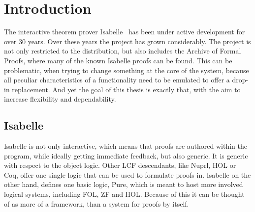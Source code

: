 
\chapter{Introduction}\label{chapter:introduction}

The interactive theorem prover Isabelle~\parencite{Paulson1986} has been under active development for over 30 years. Over these years the project has grown considerably. The project is not only restricted to the distribution, but also includes the Archive of Formal Proofs, where many of the known Isabelle proofs can be found. This can be problematic, when trying to change something at the core of the system, because all peculiar characteristics of a functionality need to be emulated to offer a drop-in replacement. And yet the goal of this thesis is exactly that, with the aim to increase flexibility and dependability.

\section{Isabelle}
Isabelle is not only interactive, which means that proofs are authored within the program, while ideally getting immediate feedback, but also generic. It is generic with respect to the object logic. Other LCF descendants, like Nuprl, HOL or Coq, offer one single logic that can be used to formulate proofs in. Isabelle on the other hand, defines one basic logic, Pure, which is meant to host more involved logical systems, including FOL, ZF and HOL. Because of this it can be thought of as more of a framework, than a system for proofs by itself.

